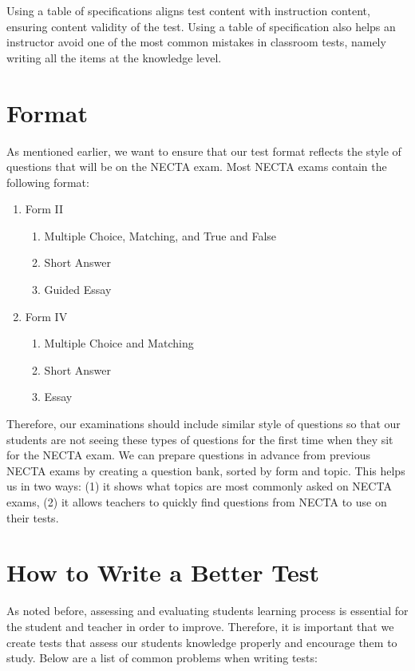 Using a table of specifications aligns test content with instruction content, ensuring content validity of the test.  Using a table of specification also helps an instructor avoid one of the most common mistakes in classroom tests, namely writing all the items at the knowledge level.

\section{Format}

As mentioned earlier, we want to ensure that our test format reflects the style of questions that will be on the NECTA exam.  Most NECTA exams contain the following format:

\begin{enumerate}
 \item Form II
 \begin{enumerate}
  \item Multiple Choice, Matching, and True and False
  \item Short Answer
  \item Guided Essay
 \end{enumerate}
 \item Form IV
  \begin{enumerate}
  \item Multiple Choice and Matching
  \item Short Answer
  \item Essay
 \end{enumerate}
\end{enumerate}

Therefore, our examinations should include similar style of questions so that our students are not seeing these types of questions for the first time when they sit for the NECTA exam.   We can prepare questions in advance from previous NECTA exams by creating a question bank, sorted by form and topic.  This helps us in two ways: (1) it shows what topics are most commonly asked on NECTA exams, (2) it allows teachers to quickly find questions from NECTA to use on their tests. 

\section{How to Write a Better Test}

As noted before, assessing and evaluating students learning process is essential for the student and teacher in order to improve.  Therefore, it is important that we create tests that assess our students knowledge properly and encourage them to study. Below are a list of common problems when writing tests:

